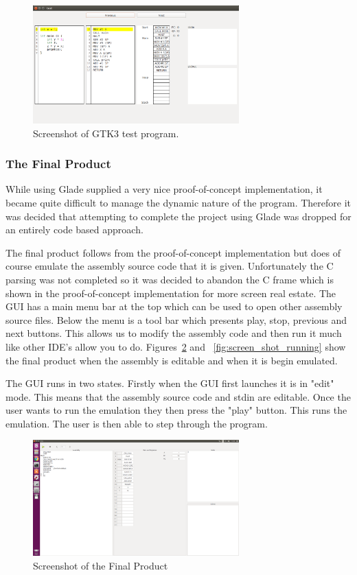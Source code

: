 \documentclass[10point]{article}
\begin{document}
\begin{figure}[h]
\centering
\includegraphics[width=300px]{GTK3TestScreenshot}
\caption{Screenshot of GTK3 test program.}
\label{fig:GTK3Test}
\end{figure}

\subsubsection{The Final Product}
While using Glade supplied a very nice proof-of-concept implementation, it became quite difficult to manage the dynamic nature of the program.  Therefore it was decided that attempting to complete the project using Glade was dropped for an entirely code based approach.

The final product follows from the proof-of-concept implementation but does of course emulate the assembly source code that it is given.  Unfortunately the C parsing was not completed so it was decided to abandon the C frame which is shown in the proof-of-concept implementation for more screen real estate.  The GUI has a main menu bar at the top which can be used to open other assembly source files.  Below the menu is a tool bar which presents play, stop, previous and next buttons.  This allows us to modify the assembly code and then run it much like other IDE's allow you to do.  Figures~\ref{fig:screen_shot} and~ \ref{fig:screen_shot_running} show the final product when the assembly is editable and when it is begin emulated.

The GUI runs in two states.  Firstly when the GUI first launches it is in "edit" mode.  This means that the assembly source code and stdin are editable.  Once the user wants to run the emulation they then press the "play" button.  This runs the emulation.  The user is then able to step through the program.

\begin{figure}[h]
    \centering
    \includegraphics[width=300px]{screen_shot}
    \caption{Screenshot of the Final Product}
    \label{fig:screen_shot}
\end{figure}
\end{document}
